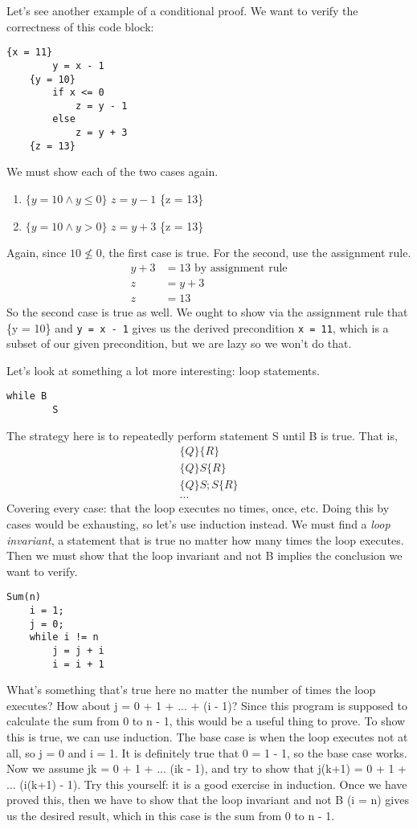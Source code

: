\documentclass[nobib]{tufte-handout}
\begin{document}
Let's see another example of a conditional proof. We want to verify 
the correctness of this code block: 
\begin{lstlisting}[caption=Example]
    {x = 11}
        y = x - 1
    {y = 10}
        if x <= 0
            z = y - 1
        else 
            z = y + 3
    {z = 13}
\end{lstlisting}
We must show each of the two cases again. 
\begin{enumerate}
    \item $\{y = 10 \land y \leq 0\}$ $z = y - 1$ \{z = 13\}
    \item  $\{y = 10 \land y > 0\}$ $z = y + 3$ \{z = 13\}
\end{enumerate}
Again, since $10 \nleq 0 $, the first case is true. 
For the second, use the assignment rule.  
\begin{align*}
    y + 3 &= 13 \text{ by assignment rule}\\
    z &= y + 3 \\
    z &= 13
\end{align*}
So the second case is true as well. We ought to show via 
the assignment rule that \{y = 10\} and \texttt{y = x - 1}
gives us the derived precondition \texttt{x = 11}, which is a subset 
of our given precondition, but we are lazy so we won't do that. 

Let's look at something a lot more interesting: loop statements. 
\begin{lstlisting}[caption=Example]
    while B
        S
\end{lstlisting}
The strategy here is to repeatedly perform statement S until B is true. 
That is, 
\begin{align*}
    \{Q\}\{R\} \\
    \{Q\}S\{R\} \\
    \{Q\}S;S\{R\} \\
    \dots
\end{align*}
Covering every case: that the loop executes no times, once, etc. 
Doing this by cases would be exhausting, so let's use induction instead. 
We must find a \emph{loop invariant}, a statement that is true no matter 
how many times the loop executes. Then we must show that the loop invariant and 
not B implies the conclusion we want to verify. 
\begin{lstlisting}[caption=Loop invariant]
    Sum(n)
    i = 1;
    j = 0;
    while i != n 
        j = j + i
        i = i + 1
\end{lstlisting}
What's something that's true here no matter the number of times the loop
executes? How about j = 0 + 1 + ... + (i - 1)? Since this program 
is supposed to calculate the sum from 0 to n - 1, this would 
be a useful thing to prove. To show this is true, 
we can use induction. The base case is when the loop executes not at all, 
so j = 0 and i = 1. It is definitely true that 0 = 1 - 1, so the base 
case works. Now we assume jk = 0 + 1 + ... (ik - 1), and try to show 
that j(k+1) = 0 + 1 + ... (i(k+1) - 1). Try this yourself: it is a good exercise 
in induction. Once we have proved this, then we have to show that the loop 
invariant and not B (i = n) gives us the desired result, which in this case 
is the sum from 0 to n - 1. 
\end{document}
